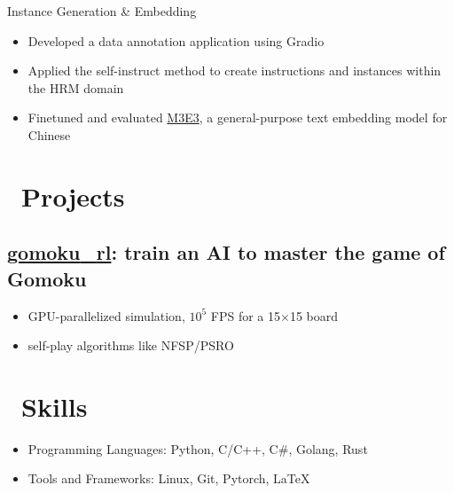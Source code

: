 \documentclass{resume}
\begin{document}
Instance Generation \& Embedding
\begin{itemize}
  \item Developed a data annotation application using Gradio
  \item Applied the self-instruct method to create instructions and instances within the HRM domain
  \item Finetuned and evaluated \href{https://huggingface.co/moka-ai/m3e-base}{M3E3}, a general-purpose text embedding model for Chinese
\end{itemize}

\section{\faRocket\ Projects}

\subsection{\faGithub\space\textbf{\href{https://github.com/hesic73/gomoku_rl}{gomoku{\_}rl}}: train an AI to master the game of Gomoku}

\begin{itemize}
  \item GPU-parallelized simulation, $10^5$ FPS for a 15$\times$15 board
  \item self-play algorithms like NFSP/PSRO
\end{itemize}


\section{\faCogs\ Skills}
\begin{itemize}[parsep=0.5ex]
  \item Programming Languages: Python, C/C++, C\#, Golang, Rust
  \item Tools and Frameworks: Linux, Git, Pytorch, \LaTeX
\end{itemize}



%
%
\end{document}
